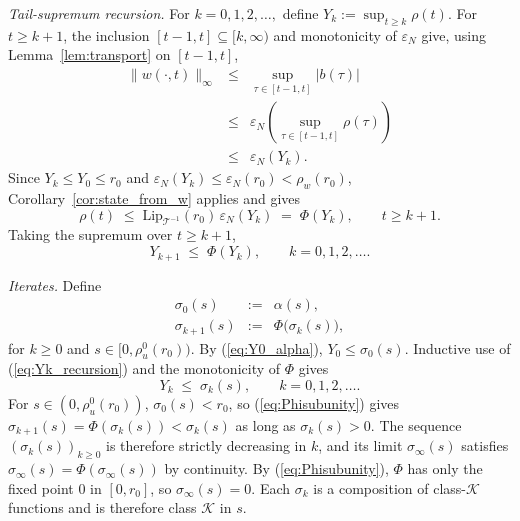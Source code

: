 \documentclass[amsthm]{autart}
\theoremstyle{plain}
\theoremstyle{definition}
\newcommand{\Tcal}{\mathcal{T}}
\newcommand{\LipT}{\mathrm{Lip}_{\Tcal^{-1}}}
\newcommand{\eps}{\varepsilon}
\begin{document}
\emph{Tail-supremum recursion.} For $k = 0, 1, 2, \ldots,$ define $Y_k := \sup_{t \ge k}\rho(t)$.
For $t \ge k+1$, the inclusion $[t-1, t] \subseteq [k, \infty)$ and monotonicity of $\eps_N$ give, using Lemma~\ref{lem:transport} on $[t-1, t]$,
\begin{eqnarray}
\|w(\cdot, t)\|_\infty &\le& \sup_{\tau \in [t-1, t]} |b(\tau)| \nonumber \\
&\le& \eps_N\!\left(\sup_{\tau \in [t-1, t]}\rho(\tau)\right) \nonumber \\
&\le& \eps_N(Y_k).
\label{eq:w_in_window}
\end{eqnarray}
Since $Y_k \le Y_0 \le r_0$ and $\eps_N(Y_k) \le \eps_N(r_0) < \rho_w(r_0)$, Corollary~\ref{cor:state_from_w} applies and gives
\begin{equation}
\rho(t) \;\le\; \LipT(r_0)\,\eps_N(Y_k) \;=\; \Phi(Y_k), \qquad t \ge k+1.
\label{eq:rho_Phi_Yk}
\end{equation}
Taking the supremum over $t \ge k+1$,
\begin{equation}
Y_{k+1} \;\le\; \Phi(Y_k), \qquad k = 0, 1, 2, \ldots.
\label{eq:Yk_recursion}
\end{equation}

\emph{Iterates.} Define
\begin{eqnarray}
\sigma_0(s) &:=& \alpha(s), \nonumber \\
\sigma_{k+1}(s) &:=& \Phi\bigl(\sigma_k(s)\bigr),
\label{eq:sigma_iterate}
\end{eqnarray}
for $k \ge 0$ and $s \in [0, \rho_u^0(r_0))$.
By (\ref{eq:Y0_alpha}), $Y_0 \le \sigma_0(s)$. Inductive use of (\ref{eq:Yk_recursion}) and the monotonicity of $\Phi$ gives
\begin{equation}
Y_k \;\le\; \sigma_k(s), \qquad k = 0, 1, 2, \ldots.
\label{eq:Yk_sigma}
\end{equation}
For $s \in (0, \rho_u^0(r_0))$, $\sigma_0(s) < r_0$, so (\ref{eq:Phisubunity}) gives $\sigma_{k+1}(s) = \Phi(\sigma_k(s)) < \sigma_k(s)$ as long as $\sigma_k(s) > 0$. The sequence $(\sigma_k(s))_{k \ge 0}$ is therefore strictly decreasing in $k$, and its limit $\sigma_\infty(s)$ satisfies $\sigma_\infty(s) = \Phi(\sigma_\infty(s))$ by continuity. By (\ref{eq:Phisubunity}), $\Phi$ has only the fixed point $0$ in $[0, r_0]$, so $\sigma_\infty(s) = 0$. Each $\sigma_k$ is a composition of class-$\mathcal{K}$ functions and is therefore class $\mathcal{K}$ in $s$.
\end{document}
